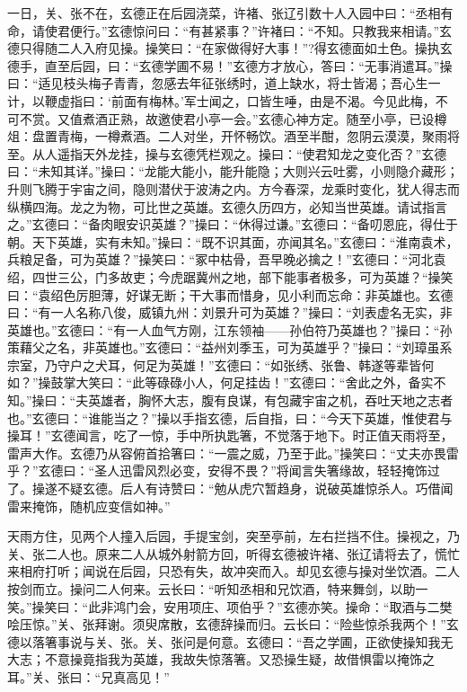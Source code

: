 一日，关、张不在，玄德正在后园浇菜，许褚、张辽引数十人入园中曰：“丞相有命，请使君便行。”玄德惊问曰：“有甚紧事？”许褚曰：“不知。只教我来相请。”玄德只得随二人入府见操。操笑曰：“在家做得好大事！”?得玄德面如土色。操执玄德手，直至后园，曰：“玄德学圃不易！”玄德方才放心，答曰：“无事消遣耳。”操曰：“适见枝头梅子青青，忽感去年征张绣时，道上缺水，将士皆渴；吾心生一计，以鞭虚指曰：‘前面有梅林。’军士闻之，口皆生唾，由是不渴。今见此梅，不可不赏。又值煮酒正熟，故邀使君小亭一会。”玄德心神方定。随至小亭，已设樽俎：盘置青梅，一樽煮酒。二人对坐，开怀畅饮。酒至半酣，忽阴云漠漠，聚雨将至。从人遥指天外龙挂，操与玄德凭栏观之。操曰：“使君知龙之变化否？”玄德曰：“未知其详。”操曰：“龙能大能小，能升能隐；大则兴云吐雾，小则隐介藏形；升则飞腾于宇宙之间，隐则潜伏于波涛之内。方今春深，龙乘时变化，犹人得志而纵横四海。龙之为物，可比世之英雄。玄德久历四方，必知当世英雄。请试指言之。”玄德曰：“备肉眼安识英雄？”操曰：“休得过谦。”玄德曰：“备叨恩庇，得仕于朝。天下英雄，实有未知。”操曰：“既不识其面，亦闻其名。”玄德曰：“淮南袁术，兵粮足备，可为英雄？”操笑曰：“冢中枯骨，吾早晚必擒之！”玄德曰：“河北袁绍，四世三公，门多故吏；今虎踞冀州之地，部下能事者极多，可为英雄？“操笑曰：“袁绍色厉胆薄，好谋无断；干大事而惜身，见小利而忘命：非英雄也。玄德曰：“有一人名称八俊，威镇九州：刘景升可为英雄？”操曰：“刘表虚名无实，非英雄也。”玄德曰：“有一人血气方刚，江东领袖——孙伯符乃英雄也？”操曰：“孙策藉父之名，非英雄也。”玄德曰：“益州刘季玉，可为英雄乎？”操曰：“刘璋虽系宗室，乃守户之犬耳，何足为英雄！”玄德曰：“如张绣、张鲁、韩遂等辈皆何如？”操鼓掌大笑曰：“此等碌碌小人，何足挂齿！”玄德曰：“舍此之外，备实不知。”操曰：“夫英雄者，胸怀大志，腹有良谋，有包藏宇宙之机，吞吐天地之志者也。”玄德曰：“谁能当之？”操以手指玄德，后自指，曰：“今天下英雄，惟使君与操耳！”玄德闻言，吃了一惊，手中所执匙箸，不觉落于地下。时正值天雨将至，雷声大作。玄德乃从容俯首拾箸曰：“一震之威，乃至于此。”操笑曰：“丈夫亦畏雷乎？”玄德曰：“圣人迅雷风烈必变，安得不畏？”将闻言失箸缘故，轻轻掩饰过了。操遂不疑玄德。后人有诗赞曰：“勉从虎穴暂趋身，说破英雄惊杀人。巧借闻雷来掩饰，随机应变信如神。”

天雨方住，见两个人撞入后园，手提宝剑，突至亭前，左右拦挡不住。操视之，乃关、张二人也。原来二人从城外射箭方回，听得玄德被许褚、张辽请将去了，慌忙来相府打听；闻说在后园，只恐有失，故冲突而入。却见玄德与操对坐饮酒。二人按剑而立。操问二人何来。云长曰：“听知丞相和兄饮酒，特来舞剑，以助一笑。”操笑曰：“此非鸿门会，安用项庄、项伯乎？”玄德亦笑。操命：“取酒与二樊哙压惊。”关、张拜谢。须臾席散，玄德辞操而归。云长曰：“险些惊杀我两个！”玄德以落箸事说与关、张。关、张问是何意。玄德曰：“吾之学圃，正欲使操知我无大志；不意操竟指我为英雄，我故失惊落箸。又恐操生疑，故借惧雷以掩饰之耳。”关、张曰：“兄真高见！”

